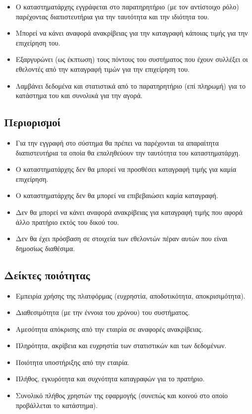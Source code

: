 \documentclass[a4paper,oneside, 12pt]{article}
\begin{document}
\begin{itemize}
	
\item Ο καταστηματάρχης εγγράφεται στο παρατηρητήριο (με τον αντίστοιχο ρόλο)
παρέχοντας διαπιστευτήρια για την ταυτότητα και την ιδιότητα του.
\item Μπορεί να κάνει αναφορά ανακρίβειας για την καταγραφή κάποιας τιμής για την
επιχείρηση του.
\item Εξαργυρώνει (ως έκπτωση) τους πόντους του συστήματος που έχουν συλλέξει οι
εθελοντές από την καταγραφή τιμών για την επιχείρηση του.
\item Λαμβάνει δεδομένα και στατιστικά από το παρατηρητήριο (επί πληρωμή) για το
κατάστημα του και συνολικά για την αγορά.

\end{itemize}

\subsection{Περιορισμοί}

\begin{itemize}
	\item Για την εγγραφή στο σύστημα θα πρέπει να παρέχονται τα απαραίτητα
	διαπιστευτήρια τα οποία θα επαληθεύουν την ταυτότητα του καταστηματάρχη.
	\item  Ο καταστηματάρχης δεν θα μπορεί να προσθέσει καταγραφή τιμής για καμία
	επιχείρηση.
	\item  Ο καταστηματάρχης δεν θα μπορεί να επιβεβαιώσει καμία καταγραφή.
	\item  Δεν θα μπορεί να κάνει αναφορά ανακρίβειας για καταγραφή τιμής που αφορά
	άλλο πρατήριο εκτός του δικού του.
	\item  Δεν θα έχει πρόσβαση σε στοιχεία των εθελοντών πέραν αυτών που είναι
	δημοσίως διαθέσιμα.
\end{itemize}

\subsection{Δείκτες ποιότητας}


\begin{itemize}
	
	\item Εμπειρία χρήσης της πλατφόρμας (ευχρηστία, αποδοτικότητα, αποκρισιμότητα).
	\item Διαθεσιμότητα (με την έννοια του χρόνου) του συστήματος.
	\item Αμεσότητα απόκρισης από την εταιρία σε αναφορές ανακρίβειας.
	\item Πληρότητα, ακρίβεια και ευχρηστία των στατιστικών και των δεδομένων.
	\item Ποιότητα υποστήριξης από την εταιρία.
	\item Πλήθος, εγκυρότητα και συχνότητα καταγραφών για το πρατήριο.
	\item Συνολικό πλήθος χρηστών της εφαρμογής (συνεπώς και κοινού στο οποίο
	προβάλλεται το κατάστημα).
	
\end{itemize}
\end{document}
